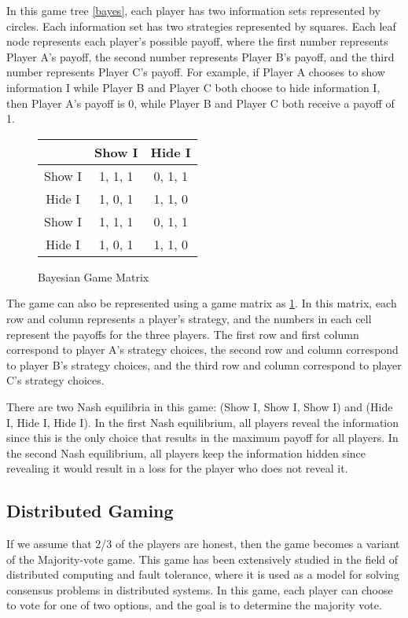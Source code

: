 \documentclass[twocolumn]{article}
\begin{document}
In this game tree \ref{bayes}, each player has two information sets represented by circles. Each information set has two strategies represented by squares. Each leaf node represents each player's possible payoff, where the first number represents Player A's payoff, the second number represents Player B's payoff, and the third number represents Player C's payoff. For example, if Player A chooses to show information I while Player B and Player C both choose to hide information I, then Player A's payoff is 0, while Player B and Player C both receive a payoff of 1.

\begin{figure}[htbp]
\begin{tabular}{c|cc}
& Show I & Hide I \\
\hline
Show I & 1, 1, 1 & 0, 1, 1 \\
Hide I & 1, 0, 1 & 1, 1, 0 \\
Show I & 1, 1, 1 & 0, 1, 1 \\
  Hide I & 1, 0, 1 & 1, 1, 0 \\
\end{tabular}
  \label{bayes mat}
  \caption{Bayesian Game Matrix}
\end{figure}


The game can also be represented using a game matrix as \ref{bayes mat}. In this matrix, each row and column represents a player's strategy, and the numbers in each cell represent the payoffs for the three players. The first row and first column correspond to player A's strategy choices, the second row and column correspond to player B's strategy choices, and the third row and column correspond to player C's strategy choices.

There are two Nash equilibria in this game: (Show I, Show I, Show I) and (Hide I, Hide I, Hide I). In the first Nash equilibrium, all players reveal the information since this is the only choice that results in the maximum payoff for all players. In the second Nash equilibrium, all players keep the information hidden since revealing it would result in a loss for the player who does not reveal it.

\subsection{Distributed Gaming}
If we assume that 2/3 of the players are honest, then the game becomes a variant of the Majority-vote game. This game has been extensively studied in the field of distributed computing and fault tolerance, where it is used as a model for solving consensus problems in distributed systems. In this game, each player can choose to vote for one of two options, and the goal is to determine the majority vote.
\end{document}
